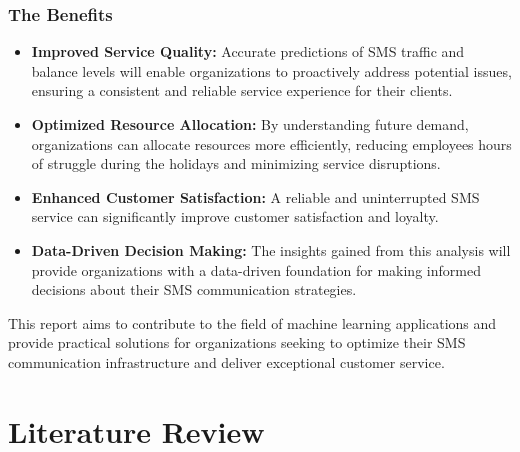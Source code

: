 \documentclass[12pt]{book} %
\begin{document}
\subsection{The Benefits}
\begin{itemize}
		\item \textbf{Improved Service Quality:} Accurate predictions of SMS traffic and balance levels will enable organizations to proactively address potential issues, ensuring a consistent and reliable service experience for their clients.
        \item \textbf{Optimized Resource Allocation:}  By understanding future demand, organizations can allocate resources more efficiently, reducing employees hours of struggle during the holidays and minimizing service disruptions.
        \item \textbf{Enhanced Customer Satisfaction:} A reliable and uninterrupted SMS service can significantly improve customer satisfaction and loyalty.
        \item \textbf{Data-Driven Decision Making:} The insights gained from this analysis will provide organizations with a data-driven foundation for making informed decisions about their SMS communication strategies.
\end{itemize}


This report aims to contribute to the field of machine learning applications and provide practical solutions for organizations seeking to optimize their SMS communication infrastructure and deliver exceptional customer service.





\chapter{Literature Review}
\end{document}
